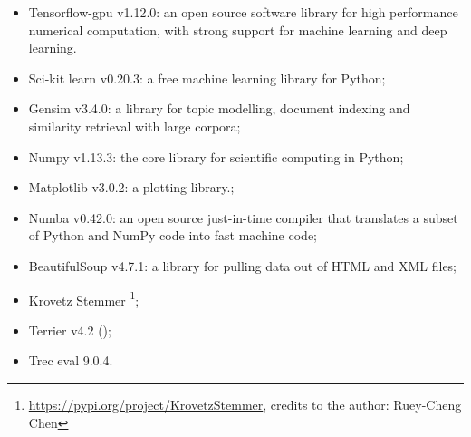 \begin{itemize}
 \item Tensorflow-gpu v1.12.0: an open source software library for high performance numerical computation, with strong support for machine learning and deep learning.
 \item Sci-kit learn v0.20.3: a free machine learning library for Python;
 \item Gensim v3.4.0: a library for topic modelling, document indexing and similarity retrieval with large corpora;
 \item Numpy v1.13.3: the core library for scientific computing in Python;
 \item Matplotlib v3.0.2: a plotting library.;
 \item Numba v0.42.0: an open source just-in-time compiler that translates a subset of Python and NumPy code into fast machine code;
 \item BeautifulSoup v4.7.1: a library for pulling data out of HTML and XML files;
 \item Krovetz Stemmer \footnote{\url{https://pypi.org/project/KrovetzStemmer}, credits to the author: Ruey-Cheng Chen};
 \item Terrier v4.2 (\cite{terrier});
 \item Trec eval 9.0.4.
\end{itemize}
